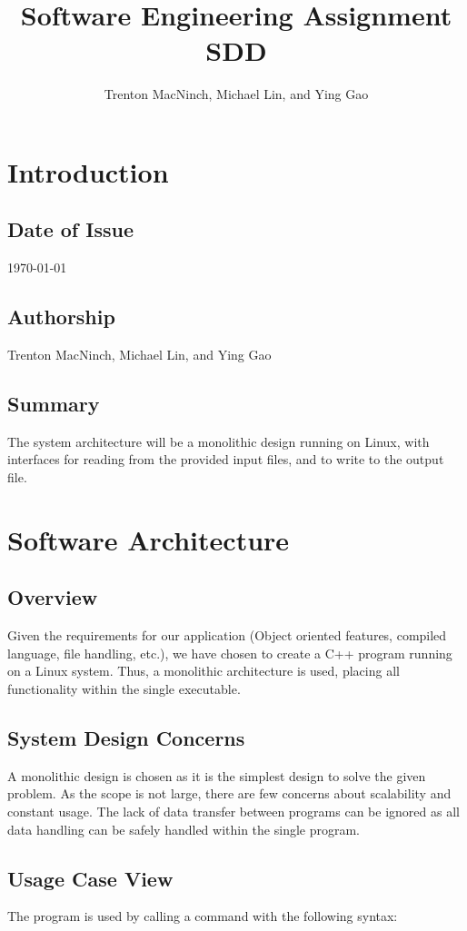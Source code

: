\documentclass{article}
\title{\textbf{Software Engineering Assignment SDD}}
\author{Trenton MacNinch, Michael Lin, and Ying Gao}
\begin{document}
\maketitle
\newpage

\tableofcontents
\newpage

\section{Introduction}
\subsection{Date of Issue}
\today
\subsection{Authorship}
Trenton MacNinch, Michael Lin, and Ying Gao
\subsection{Summary}
The system architecture will be a monolithic design running on Linux, with interfaces for reading from the provided input files, and to write to the output file.

\section{Software Architecture}
\subsection{Overview}
Given the requirements for our application (Object oriented features, compiled language, file handling, etc.), we have chosen to create a C++ program running on a Linux system. Thus, a monolithic architecture is used, placing all functionality within the single executable.
\subsection{System Design Concerns}
A monolithic design is chosen as it is the simplest design to solve the given problem. As the scope is not large, there are few concerns about scalability and constant usage. The lack of data transfer between programs can be ignored as all data handling can be safely handled within the single program.
\subsection{Usage Case View}
The program is used by calling a command with the following syntax:
\end{document}

